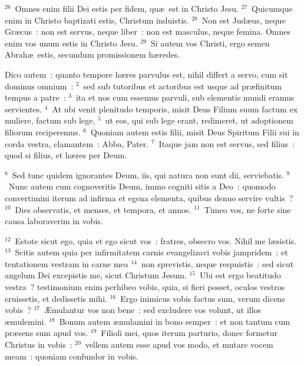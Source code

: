 ${}^{26}$~Omnes enim filii Dei estis per fidem, qu\ae\ est in Christo Jesu.
${}^{27}$~Quicumque enim in Christo baptizati estis, Christum induistis.
${}^{28}$~Non est Jud\ae us, neque Gr\ae cus~: non est servus, neque liber~: non est masculus, neque femina. Omnes enim vos unum estis in Christo Jesu.
${}^{29}$~Si autem vos Christi, ergo semen Abrah\ae\ estis, secundum promissionem h\ae redes.

\bchapter
\lettrine[lines=3,image=true,loversize=0.05,lraise=-0.03]{D}{}ico autem~: quanto tempore h\ae res parvulus est, nihil differt a servo, cum sit dominus omnium~:
${}^{2}$~sed sub tutoribus et actoribus est usque ad pr\ae finitum tempus a patre~:
${}^{3}$~ita et nos cum essemus parvuli, sub elementis mundi eramus servientes.
${}^{4}$~At ubi venit plenitudo temporis, misit Deus Filium suum factum ex muliere, factum sub lege,
${}^{5}$~ut eos, qui sub lege erant, redimeret, ut adoptionem filiorum reciperemus.
${}^{6}$~Quoniam autem estis filii, misit Deus Spiritum Filii sui in corda vestra, clamantem~: Abba, Pater.
${}^{7}$~Itaque jam non est servus, sed filius~: quod si filius, et h\ae res per Deum.


${}^{8}$~Sed tunc quidem ignorantes Deum, iis, qui natura non sunt dii, serviebatis.
${}^{9}$~Nunc autem cum cognoveritis Deum, immo cogniti sitis a Deo~: quomodo convertimini iterum ad infirma et egena elementa, quibus denuo servire vultis~?
${}^{10}$~Dies observatis, et menses, et tempora, et annos.
${}^{11}$~Timeo vos, ne forte sine causa laboraverim in vobis.


${}^{12}$~Estote sicut ego, quia et ego sicut vos~: fratres, obsecro vos. Nihil me l\ae sistis.
${}^{13}$~Scitis autem quia per infirmitatem carnis evangelizavi vobis jampridem~: et tentationem vestram in carne mea
${}^{14}$~non sprevistis, neque respuistis~: sed sicut angelum Dei excepistis me, sicut Christum Jesum.
${}^{15}$~Ubi est ergo beatitudo vestra~? testimonium enim perhibeo vobis, quia, si fieri posset, oculos vestros eruissetis, et dedissetis mihi.
${}^{16}$~Ergo inimicus vobis factus sum, verum dicens vobis~?
${}^{17}$~\AE mulantur vos non bene~: sed excludere vos volunt, ut illos \ae mulemini.
${}^{18}$~Bonum autem \ae mulamini in bono semper~: et non tantum cum pr\ae sens sum apud vos.
${}^{19}$~Filioli mei, quos iterum parturio, donec formetur Christus in vobis~:
${}^{20}$~vellem autem esse apud vos modo, et mutare vocem meam~: quoniam confundor in vobis.


